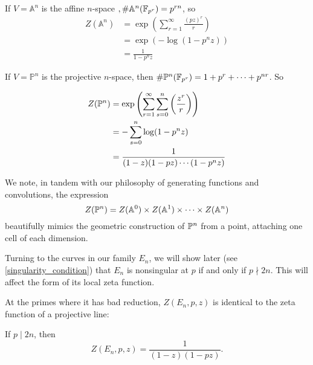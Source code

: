\documentclass[12pt, a4paper]{report}
\begin{document}
\begin{example}
  If $V = \mathbb{A}^n$ is the affine
  $n$-space $, \#\mathbb{A}^n(\mathbb{F}_{p^r}) = p^{rn}$, so
  \begin{equation*}
    \begin{split}
      Z(\mathbb{A}^n) &= \exp \left(  \sum\limits_{r=1}^\infty \frac{(pz)^r}{r} \right) \\
      &= \exp ( - \log (1-p^nz) ) \\
      &= \frac{1}{1-p^nz}
    \end{split}
  \end{equation*}
\end{example}

\begin{example}
  If $V = \mathbb{P}^n$ is the projective $n$-space,
  then $\# {\mathbb P}^n(\mathbb{F}_{p^r})  
  = 1 + p^r + \cdots + p^{nr}$. So

  \begin{equation*}
    \begin{split}
      Z(\mathbb{{\mathbb P}}^n) &= \exp \left(  \sum\limits_{r=1}^\infty
        \sum\limits_{s=0}^{n} \left(  \frac{z^r}{r}  \right) \right) \\
      &= - \sum\limits_{s=0}^{n} \log (1 - p^n z) \\
      &= \frac{1}{(1-z) (1-pz) \cdots (1-p^{n} z)}
    \end{split}
  \end{equation*}
\end{example}

We note, in tandem with our philosophy of generating functions and convolutions,
the expression
\[Z({\mathbb P}^n) = Z(\mathbb{A}^0) \times Z(\mathbb{A}^1) \times \cdots \times Z(\mathbb{A}^n)\]
beautifully mimics the geometric construction of ${\mathbb P}^n$ from a point, attaching
one cell of each dimension. 

Turning to the curves in our family $E_n$, we will show later
(see \autoref{singularity_condition})
that $E_n$ is nonsingular at $p$ if and only if $p \nmid 2n$. This will affect
the form of its local zeta function.

At the primes where it has bad reduction, $Z(E_n,p,z)$ is identical to the zeta
function of a projective line:

\begin{prop}
  If $p \mid 2n$, then
  \[Z(E_n, p, z) = \frac{1}{(1-z)(1-pz)}.\]
\end{prop}
\end{document}

